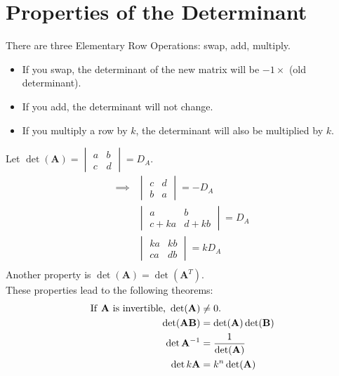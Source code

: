 \documentclass[nobib]{tufte-handout}
\begin{document}
\section{Properties of the Determinant}
There are three Elementary Row Operations: swap, add, multiply.
\begin{itemize}
    \item If you swap, the determinant of the new matrix will be $-1\times$ (old determinant).
    \item If you add, the determinant will not change.
    \item If you multiply a row by $k$, the determinant will also be multiplied by $k$.
\end{itemize}
Let $\det(\mathbf{A})=\begin{vmatrix}a & b\\ c & d\end{vmatrix} = D_A$.\\
\begin{align*}
    \implies &\begin{vmatrix}c & d\\ b & a\end{vmatrix} = -D_A\\
    &\begin{vmatrix}a & b\\ c+ka & d+kb\end{vmatrix} = D_A\\
    &\begin{vmatrix}ka & kb\\ ca & db\end{vmatrix} = kD_A\\
\end{align*}
Another property is $\det(\mathbf{A}) = \det(\mathbf{A}^T)$.\\
These properties lead to the following theorems:\\
\begin{align*}
\text{If \textbf{A} is invertible, }\det(\mathbf{A})&\neq 0.\\
\det(\mathbf{AB}) &= \det(\mathbf{A})\det(\mathbf{B})\\
\det{\mathbf{A}}^{-1} &= \frac{1}{\det(\mathbf{A})}\\
\det{k\mathbf{A}} &= k^n\det(\mathbf{A})
\end{align*}
\end{document}
